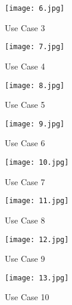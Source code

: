 \documentclass[12pt,letterpaper]{report}
\begin{document}
\begin{figure}[h]
    \begin{center}
    \texttt{[image: 6.jpg]}
    \end{center}
       \caption{Use Case 3 \label{Use Case 3}}
\end{figure}

\begin{figure}[h]
    \begin{center}
    \texttt{[image: 7.jpg]}
    \end{center}
       \caption{Use Case 4 \label{Use Case 4}}
\end{figure}

\begin{figure}[h]
    \begin{center}
    \texttt{[image: 8.jpg]}
    \end{center}
       \caption{Use Case 5 \label{Use Case 5}}
\end{figure}

\begin{figure}[h]
    \begin{center}
    \texttt{[image: 9.jpg]}
    \end{center}
       \caption{Use Case 6 \label{Use Case 6}}
\end{figure}

\begin{figure}[h]
    \begin{center}
    \texttt{[image: 10.jpg]}
    \end{center}
       \caption{Use Case 7 \label{Use Case 7}}
\end{figure}

\begin{figure}[h]
    \begin{center}
    \texttt{[image: 11.jpg]}
    \end{center}
       \caption{Use Case 8 \label{Use Case 8}}
\end{figure}

\begin{figure}[h]
    \begin{center}
    \texttt{[image: 12.jpg]}
    \end{center}
       \caption{Use Case 9 \label{Use Case 9}}
\end{figure}

\begin{figure}[h]
    \begin{center}
    \texttt{[image: 13.jpg]}
    \end{center}
       \caption{Use Case 10 \label{Use Case 10}}
\end{figure}
\end{document}
